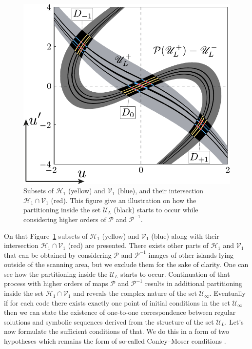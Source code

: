\begin{figure}[h]
\centering
	\includegraphics[scale = 1]{pic/h- and v-strips for piecewise equation}
	\caption{
		Subsets of $\mathscr{H}_1$ (yellow) and $\mathscr{V}_1$ (blue), and their intersection $\mathscr{H}_1 \cap \mathscr{V}_1$ (red).
		This figure give an illustration on how the partitioning inside the set $\mathscr{U}_L$ (black) starts to occur while considering higher orders of $\mathcal{P}$ and $\mathcal{P}^{-1}$.
	}
\label{fig:hv-strips-piecewise}
\end{figure}

On that Figure~\ref{fig:hv-strips-piecewise} subsets of $\mathscr{H}_1$ (yellow) and $\mathscr{V}_1$ (blue) along with their intersection $\mathscr{H}_1 \cap \mathscr{V}_1$ (red) are presented.
There exists other parts of $\mathscr{H}_1$ and $\mathscr{V}_1$ that can be obtained by considering $\mathcal{P}$ and $\mathcal{P}^{-1}$-images of other islands lying outside of the scanning area, but we exclude them for the sake of clarity.
One can see how the partitioning inside the $\mathscr{U}_L$ starts to occur.
Continuation of that process with higher orders of maps $\mathcal{P}$ and $\mathcal{P}^{-1}$ results in additional partitioning inside the set $\mathscr{H}_1 \cap \mathscr{V}_1$ and reveals the complex nature of the set $\mathscr{U}_{\infty}$.
Eventually if for each code there exists exactly one point of initial conditions in the set $\mathscr{U}_{\infty}$ then we can state the existence of one-to-one correspondence between regular solutions and symbolic sequences derived from the structure of the set $\mathscr{U}_L$.
Let's now formulate the sufficient conditions of that.
We do this in a form of two hypotheses which remains the form of so-called Conley--Moser conditions \cite[Chapter 25]{Wiggins}.

